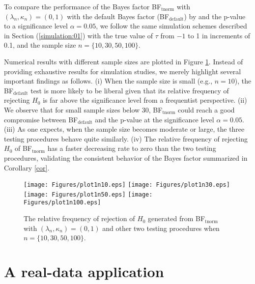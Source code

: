 \documentclass[11pt]{article}
\begin{document}
To compare the performance of the Bayes factor BF$_\mathrm{tnorm}$ with $(\lambda_n, \kappa_n) = (0, 1)$ with the default Bayes factor (BF$_\mathrm{default}$) by \cite{Doorn:Ly:Wage:2018}  and the p-value to a significance level $\alpha=0.05$, we follow the same simulation schemes described in Section (\ref{simulation:01}) with the true value of $\tau$ from $-1$ to 1 in increments of 0.1, and the sample size $n= \{10, 30, 50, 100\}$.

Numerical results with different sample sizes are plotted in Figure \ref{FIG:FR1}. Instead of providing exhaustive results for simulation studies, we merely highlight several important findings as follows. (i) When the sample size is small (e.g., $n=10$), the BF$_\mathrm{default}$ test is more likely to be liberal given that its relative frequency of rejecting $H_0$ is far above the significance level from a frequentist perspective. (ii) We observe that for small sample sizes below 30, BF$_\mathrm{tnorm}$ could reach a good compromise between BF$_\mathrm{default}$ and the p-value at the significance level $\alpha=0.05$. (iii) As one expects, when the sample size becomes moderate or large, the three testing procedures behave quite similarly. (iv) The relative frequency of rejecting $H_0$ of BF$_\mathrm{tnorm}$ has a faster decreasing rate to zero than the two testing procedures, validating the consistent behavior of the Bayes factor summarized in Corollary \ref{cor}.

{
\begin{figure}[!t]
\centering
\texttt{[image: Figures/plot1n10.eps]}
\texttt{[image: Figures/plot1n30.eps]}
\texttt{[image: Figures/plot1n50.eps]}
\texttt{[image: Figures/plot1n100.eps]}
\caption{The relative frequency of rejection of $H_0$ generated from BF$_\mathrm{tnorm}$ with $(\lambda_n, \kappa_n) = (0, 1)$ and other two testing procedures when $n=\{10, 30, 50, 100\}$.} \label{FIG:FR1}
\end{figure}
}

\section{A real-data application} \label{section:04}
\end{document}
